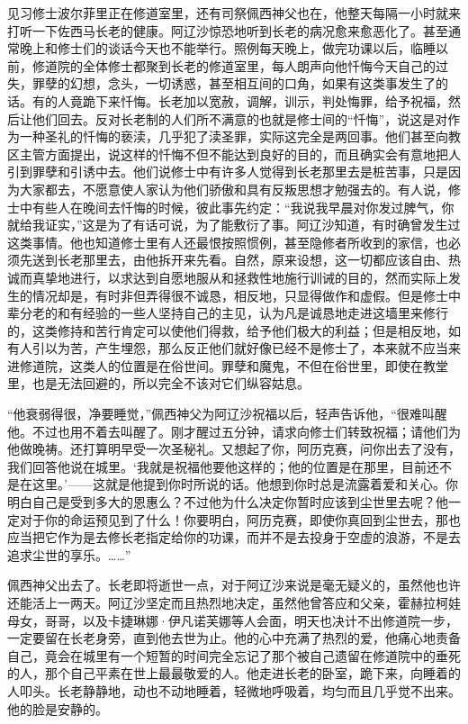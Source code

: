 \par 见习修士波尔菲里正在修道室里，还有司祭佩西神父也在，他整天每隔一小时就来打听一下佐西马长老的健康。阿辽沙惊恐地听到长老的病况愈来愈恶化了。甚至通常晚上和修士们的谈话今天也不能举行。照例每天晚上，做完功课以后，临睡以前，修道院的全体修士都聚到长老的修道室里，每人朗声向他忏悔今天自己的过失，罪孽的幻想，念头，一切诱惑，甚至相互间的口角，如果有这类事发生了的话。有的人竟跪下来忏悔。长老加以宽赦，调解，训示，判处悔罪，给予祝福，然后让他们回去。反对长老制的人们所不满意的也就是修士间的“忏悔”，说这是对作为一种圣礼的忏悔的亵渎，几乎犯了渎圣罪，实际这完全是两回事。他们甚至向教区主管方面提出，说这样的忏悔不但不能达到良好的目的，而且确实会有意地把人引到罪孽和引诱中去。他们说修士中有许多人觉得到长老那里去是桩苦事，只是因为大家都去，不愿意使人家认为他们骄傲和具有反叛思想才勉强去的。有人说，修士中有些人在晚间去忏悔的时候，彼此事先约定：“我说我早晨对你发过脾气，你就给我证实，”这是为了有话可说，为了能敷衍了事。阿辽沙知道，有时确曾发生过这类事情。他也知道修士里有人还最恨按照惯例，甚至隐修者所收到的家信，也必须先送到长老那里去，由他拆开来先看。自然，原来设想，这一切都应该自由、热诚而真挚地进行，以求达到自愿地服从和拯救性地施行训诫的目的，然而实际上发生的情况却是，有时非但弄得很不诚恳，相反地，只显得做作和虚假。但是修士中辈分老的和有经验的一些人坚持自己的主见，认为凡是诚恳地走进这墙里来修行的，这类修持和苦行肯定可以使他们得救，给予他们极大的利益；但是相反地，如有人引以为苦，产生埋怨，那么反正他们就好像已经不是修士了，本来就不应当来进修道院，这类人的位置是在俗世间。罪孽和魔鬼，不但在俗世里，即使在教堂里，也是无法回避的，所以完全不该对它们纵容姑息。
\par “他衰弱得很，净要睡觉，”佩西神父为阿辽沙祝福以后，轻声告诉他，“很难叫醒他。不过也用不着去叫醒了。刚才醒过五分钟，请求向修士们转致祝福；请他们为他做晚祷。还打算明早受一次圣秘礼。又想起了你，阿历克赛，问你出去了没有，我们回答他说在城里。‘我就是祝福他要他这样的；他的位置是在那里，目前还不是在这里。’——这就是他提到你时所说的话。他想到你时总是流露着爱和关心。你明白自己是受到多大的恩惠么？不过他为什么决定你暂时应该到尘世里去呢？他一定对于你的命运预见到了什么！你要明白，阿历克赛，即使你真回到尘世去，那也应当把它作为是去修长老指定给你的功课，而并不是去投身于空虚的浪游，不是去追求尘世的享乐。……”
\par 佩西神父出去了。长老即将逝世一点，对于阿辽沙来说是毫无疑义的，虽然他也许还能活上一两天。阿辽沙坚定而且热烈地决定，虽然他曾答应和父亲，霍赫拉柯娃母女，哥哥，以及卡捷琳娜·伊凡诺芙娜等人会面，明天也决计不出修道院一步，一定要留在长老身旁，直到他去世为止。他的心中充满了热烈的爱，他痛心地责备自己，竟会在城里有一个短暂的时间完全忘记了那个被自己遗留在修道院中的垂死的人，那个自己平素在世上最最敬爱的人。他走进长老的卧室，跪下来，向睡着的人叩头。长老静静地，动也不动地睡着，轻微地呼吸着，均匀而且几乎觉不出来。他的脸是安静的。
